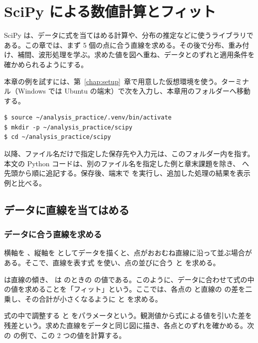 \chapter{SciPy による数値計算とフィット}
\label{chap:scipy}

SciPy は、データに式を当てはめる計算や、分布の推定などに使うライブラリである。この章では、まず 5 個の点に合う直線を求める。その後で分布、重み付け、補間、波形処理を学ぶ。求めた値を図へ重ね、データとのずれと適用条件を確かめられるようにする。

本章の例を試すには、第~\ref{chap:setup}~章で用意した仮想環境を使う。ターミナル（Windows では Ubuntu の端末）で次を入力し、本章用のフォルダーへ移動する。

\begin{lstlisting}[numbers=none, xleftmargin=2\zw]
$ source ~/analysis_practice/.venv/bin/activate
$ mkdir -p ~/analysis_practice/scipy
$ cd ~/analysis_practice/scipy
\end{lstlisting}

以降、ファイル名だけで指定した保存先や入力元は、このフォルダー内を指す。本文の Python コードは、別のファイル名を指定した例と章末課題を除き、 へ先頭から順に追記する。保存後、端末で  を実行し、追加した処理の結果を表示例と比べる。

\section{データに直線を当てはめる}

\subsection{データに合う直線を求める}

横軸を 、縦軸を  としてデータを描くと、点がおおむね直線に沿って並ぶ場合がある。そこで、直線を表す式  を使い、点の並びに合う  と  を求める。

 は直線の傾き、 は  のときの  の値である。このように、データに合わせて式の中の値を求めることを「フィット」という。ここでは、各点の  と直線の  の差を二乗し、その合計が小さくなるように  と  を求める。

式の中で調整する  と  をパラメータという。観測値から式による値を引いた差を残差という。求めた直線をデータと同じ図に描き、各点とのずれを確かめる。次の  の例で、この 2 つの値を計算する。

